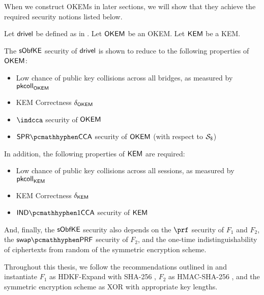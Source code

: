 When we construct OKEMs in later sections, we will show that they achieve the required security notions listed below.

\begin{theorem}
\label{thm:drivel-security}
    Let $\textsf{drivel}$ be defined as in \cite[Fig.~6]{EPRINT:GRSV25}. Let $\mathsf{OKEM}$ be an OKEM. Let $\mathsf{KEM}$ be a KEM.
    
    The $\mathsf{sObfKE}$ security of $\textsf{drivel}$ is shown to reduce to the following properties of $\mathsf{OKEM}$:
    \begin{itemize}
        \item Low chance of public key collisions across all bridges, as measured by $\mathsf{pkcoll}_{\mathsf{OKEM}}$
        \item KEM Correctness $\delta_{\mathsf{OKEM}}$
        \item $\indcca$ security of $\mathsf{OKEM}$
        \item $\sprcca$ security of $\mathsf{OKEM}$ (with respect to $\simulbin$)
    \end{itemize}

    In addition, the following properties of $\mathsf{KEM}$ are required:
    \begin{itemize}
        \item Low chance of public key collisions across all sessions, as measured by $\mathsf{pkcoll}_{\mathsf{KEM}}$
        \item KEM Correctness $\delta_{\mathsf{KEM}}$
        \item $\indonecca$ security of $\mathsf{KEM}$
    \end{itemize}

    And, finally, the $\mathsf{sObfKE}$ security also depends on the $\prf$ security of $F_1$ and $F_2$, the $\swapprf$ security of $F_2$, and the one-time indistinguishability of ciphertexts from random of the symmetric encryption scheme.    
\end{theorem}

Throughout this thesis, we follow the recommendations outlined in \cite[Section~4.2]{EPRINT:GRSV25} and instantiate $F_1$ as \textsf{HDKF-Expand} with \textsf{SHA-256} \cite{C:Krawczyk10,rfc5869}, $F_2$ as \textsf{HMAC-SHA-256} \cite{C:BelCanKra96,KraBelCan97}, and the symmetric encryption scheme as XOR with appropriate key lengths.

